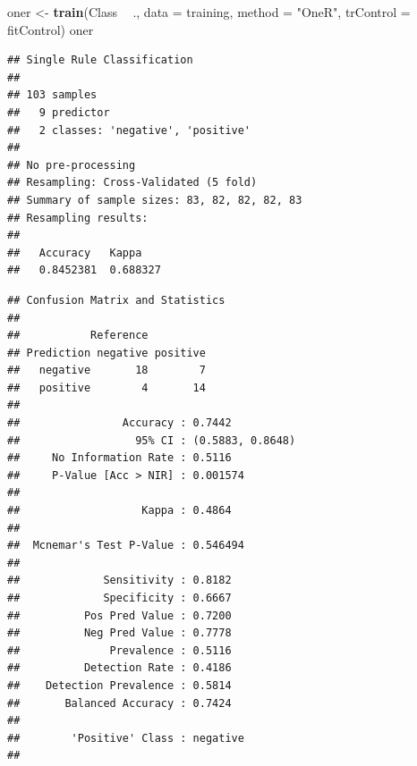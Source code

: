 \documentclass[]{article}
\newenvironment{Shaded}{\begin{snugshade}}{\end{snugshade}}
\newcommand{\DataTypeTok}[1]{\textcolor[rgb]{0.13,0.29,0.53}{#1}}
\newcommand{\KeywordTok}[1]{\textcolor[rgb]{0.13,0.29,0.53}{\textbf{#1}}}
\newcommand{\NormalTok}[1]{#1}
\newcommand{\OperatorTok}[1]{\textcolor[rgb]{0.81,0.36,0.00}{\textbf{#1}}}
\newcommand{\StringTok}[1]{\textcolor[rgb]{0.31,0.60,0.02}{#1}}
\begin{document}
\begin{Shaded}
\begin{Highlighting}[]
\NormalTok{oner <-}\StringTok{ }\KeywordTok{train}\NormalTok{(Class }\OperatorTok{~}\StringTok{ }\NormalTok{., }\DataTypeTok{data =}\NormalTok{ training, }\DataTypeTok{method =} \StringTok{"OneR"}\NormalTok{, }\DataTypeTok{trControl =}\NormalTok{ fitControl)}
\NormalTok{oner}
\end{Highlighting}
\end{Shaded}

\begin{verbatim}
## Single Rule Classification 
## 
## 103 samples
##   9 predictor
##   2 classes: 'negative', 'positive' 
## 
## No pre-processing
## Resampling: Cross-Validated (5 fold) 
## Summary of sample sizes: 83, 82, 82, 82, 83 
## Resampling results:
## 
##   Accuracy   Kappa   
##   0.8452381  0.688327
\end{verbatim}

\begin{Shaded}
\end{Shaded}

\begin{verbatim}
## Confusion Matrix and Statistics
## 
##           Reference
## Prediction negative positive
##   negative       18        7
##   positive        4       14
##                                           
##                Accuracy : 0.7442          
##                  95% CI : (0.5883, 0.8648)
##     No Information Rate : 0.5116          
##     P-Value [Acc > NIR] : 0.001574        
##                                           
##                   Kappa : 0.4864          
##                                           
##  Mcnemar's Test P-Value : 0.546494        
##                                           
##             Sensitivity : 0.8182          
##             Specificity : 0.6667          
##          Pos Pred Value : 0.7200          
##          Neg Pred Value : 0.7778          
##              Prevalence : 0.5116          
##          Detection Rate : 0.4186          
##    Detection Prevalence : 0.5814          
##       Balanced Accuracy : 0.7424          
##                                           
##        'Positive' Class : negative        
## 
\end{verbatim}
\end{document}
